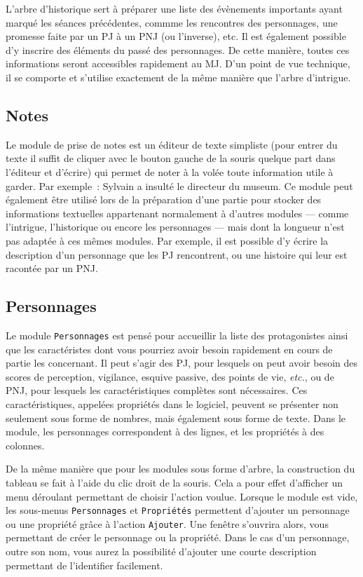 \documentclass[a4paper,12pt]{article}
\newcommand*{\interfaceitem}[1]{\texttt{#1}}
\newcommand*{\guillemets}[1]{\og #1\fg{}\xspace}
\begin{document}
L'arbre d'historique sert à préparer une liste des évènements importants ayant marqué les séances précédentes, commme les rencontres des personnages, une promesse faite par un PJ à un PNJ (ou l'inverse), etc.
Il est également possible d'y inscrire des éléments du passé des personnages.
De cette manière, toutes ces informations seront accessibles rapidement au MJ.
D'un point de vue technique, il se comporte et s'utilise exactement de la même manière que l'arbre d'intrigue.

\subsection{Notes}
\label{sec:notes}

Le module de prise de notes est un éditeur de texte simpliste (pour entrer du texte il suffit de cliquer avec le bouton gauche de la souris quelque part dans l'éditeur et d'écrire) qui permet de noter à la volée toute information utile à garder.
Par exemple~: \guillemets{Sylvain a insulté le directeur du museum}.
Ce module peut également être utilisé lors de la préparation d'une partie pour stocker des informations textuelles appartenant normalement à d'autres modules --- comme l'intrigue, l'historique ou encore les personnages --- mais dont la longueur n'est pas adaptée à ces mêmes modules.
Par exemple, il est possible d'y écrire la description d'un personnage que les PJ rencontrent, ou une histoire qui leur est racontée par un PNJ.

\subsection{Personnages}
\label{sec:perso}

Le module \interfaceitem{Personnages} est pensé pour accueillir la liste des protagonistes ainsi que les caractéristes dont vous pourriez avoir besoin rapidement en cours de partie les concernant.
Il peut s'agir des PJ, pour lesquels on peut avoir besoin des scores de perception, vigilance, esquive passive, des points de vie, \emph{etc.}, ou de PNJ, pour lesquels les caractéristiques complètes sont nécessaires.
Ces caractéristiques, appelées \guillemets{propriétés} dans le logiciel, peuvent se présenter non seulement sous forme de nombres, mais également sous forme de texte.
Dans le module, les personnages correspondent à des lignes, et les propriétés à des colonnes.

De la même manière que pour les modules sous forme d'arbre, la construction du tableau se fait à l'aide du clic droit de la souris.
Cela a pour effet d'afficher un menu déroulant permettant de choisir l'action voulue.
Lorsque le module est vide, les sous-menus \interfaceitem{Personnages} et \interfaceitem{Propriétés} permettent d'ajouter un personnage ou une propriété grâce à l'action \interfaceitem{Ajouter}.
Une fenêtre s'ouvrira alors, vous permettant de créer le personnage ou la propriété.
Dans le cas d'un personnage, outre son nom, vous aurez la possibilité d'ajouter une courte description permettant de l'identifier facilement.
\end{document}
